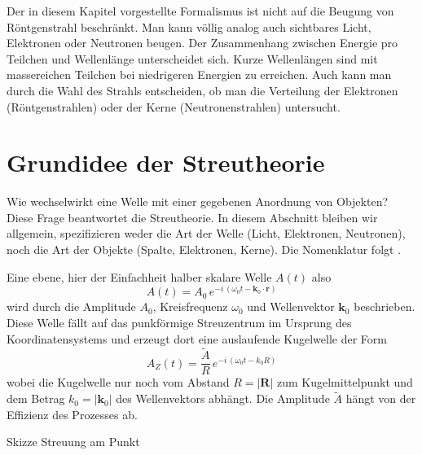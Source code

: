 Der in diesem Kapitel vorgestellte Formalismus ist nicht auf die Beugung von Röntgenstrahl beschränkt. Man kann völlig analog auch sichtbares Licht, Elektronen oder Neutronen beugen. Der Zusammenhang zwischen Energie pro Teilchen und Wellenlänge unterscheidet sich. Kurze Wellenlängen sind mit massereichen Teilchen bei niedrigeren Energien zu erreichen.  Auch kann man durch die Wahl des Strahls entscheiden, ob man die Verteilung der Elektronen (Röntgenstrahlen) oder der Kerne (Neutronenstrahlen) untersucht. 


\section{Grundidee der Streutheorie}

Wie wechselwirkt eine Welle mit einer gegebenen Anordnung von Objekten? Diese Frage beantwortet die Streutheorie. In diesem Abschnitt bleiben wir allgemein, spezifizieren weder die Art der Welle (Licht, Elektronen, Neutronen), noch die Art der Objekte (Spalte, Elektronen, Kerne). Die Nomenklatur folgt \cite{Hunklinger2014}.

Eine ebene, hier der Einfachheit halber skalare Welle $A(t)$ also
\begin{equation}
 A(t) = A_0 \, e^{- i \, (\omega_0 t - \mathbf{k}_0 \cdot \mathbf{r})}
\end{equation}
wird durch die Amplitude $A_0$, Kreisfrequenz $\omega_0$ und Wellenvektor $\mathbf{k}_0$ beschrieben. Diese Welle fällt auf das punkförmige Streuzentrum im Ursprung des Koordinatensystems und erzeugt dort eine auslaufende Kugelwelle der Form
\begin{equation}
 A_Z(t) = \frac{\tilde{A}}{R} \,  e^{- i \, (\omega_0 t - k_0 R)}
\end{equation}
wobei  die Kugelwelle nur noch vom Abstand $R = |\mathbf{R}|$ zum Kugelmittelpunkt und dem Betrag $k_0 = | \mathbf{k}_0| $ des Wellenvektors abhängt. Die Amplitude $\tilde{A}$ hängt von der Effizienz des Prozesses ab.

\begin{marginfigure}
\caption{Skizze Streuung am Punkt}
\end{marginfigure}




